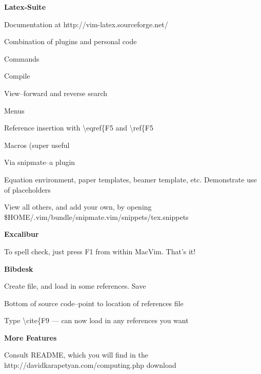 \documentclass[12pt]{amsart}
\begin{document}
\begin{outline}
\begin{outline}
  \end{outline}
\item{\bf Latex-Suite}
  \begin{outline}
  \item{ Documentation at http://vim-latex.sourceforge.net/}
  \item{ Combination of plugins and personal code}
  \item{ Commands}
    \begin{outline}
    \item{Compile }
    \item{ View--forward and reverse search}
    \end{outline}
  \item{ Menus}
  \item{ Reference insertion with \textbackslash eqref\{F5 and \textbackslash ref\{F5}
  \item{ Macros (super useful}
    \begin{outline}
    \item{Via snipmate--a plugin }
    \item{ Equation environment, paper templates, beamer template,
      etc. Demonstrate use of placeholders}
    \item{ View all others, and add your own, by opening \\
      \$HOME/.vim/bundle/snipmate.vim/snippets/tex.snippets}
    \end{outline}



  \end{outline}
\item{ \bf Excalibur}
  \begin{outline}
  \item{To spell check, just press F1 from within MacVim. That's
    it!} 
  \end{outline}
\item{\bf Bibdesk }
  \begin{outline}
  \item{Create file, and load in some references. Save}
  \item{ Bottom of source code--point to location of
    references file}
  \item{ Type \textbackslash cite\{F9 --- can now load in any references you
    want}
  \end{outline}
\item{ \bf More Features}
  \begin{outline}
  \item{Consult README, which you will find in the \\
    http://davidkarapetyan.com/computing.php download }
  \end{outline}
\end{outline}
\end{document}
